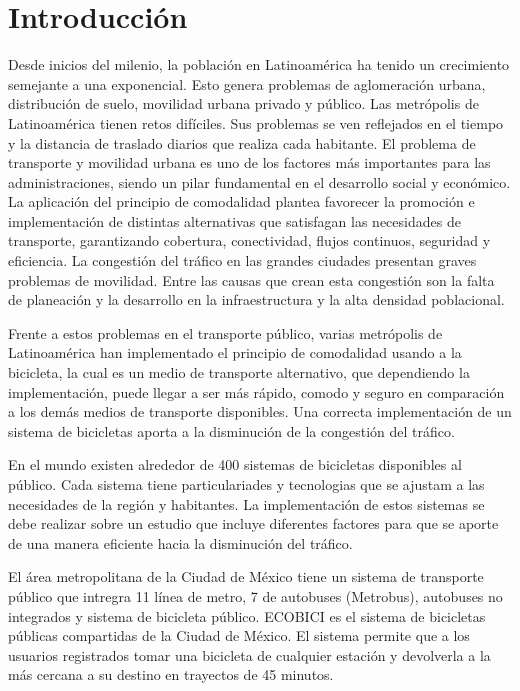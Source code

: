 \section{Introducción}

Desde inicios del milenio, la población en Latinoamérica ha tenido un crecimiento semejante a una exponencial\cite{CEPAL_2015}. Esto genera problemas de aglomeración urbana, distribución de suelo, movilidad urbana privado y público. Las metrópolis de Latinoamérica tienen retos difíciles. Sus problemas se ven reflejados en el tiempo y la distancia de traslado diarios que realiza cada habitante\cite{hall_1978}. El problema de transporte y movilidad urbana es uno de los factores más importantes para las administraciones, siendo un pilar fundamental en el desarrollo social y económico. La aplicación del principio de comodalidad plantea favorecer la promoción e implementación de distintas alternativas que satisfagan las necesidades de transporte, garantizando cobertura, conectividad, flujos continuos, seguridad y eficiencia\cite{pastori_2018}. La congestión del tráfico en las grandes ciudades presentan graves problemas de movilidad. Entre las causas que crean esta congestión son la falta de planeación y la desarrollo en la infraestructura y la alta densidad poblacional.

Frente a estos problemas en el transporte público, varias metrópolis de Latinoamérica han implementado el principio de comodalidad usando a la bicicleta, la cual es un medio de transporte alternativo, que dependiendo la implementación, puede llegar a ser más rápido, comodo y seguro en comparación a los demás medios de transporte disponibles.
Una correcta implementación de un sistema de bicicletas aporta a la disminución de la congestión del tráfico.

En el mundo existen alrededor de 400 sistemas de bicicletas disponibles al público. Cada sistema tiene particulariades y tecnologias que se ajustam a las necesidades de la región y habitantes. La implementación de estos sistemas se debe realizar sobre un estudio que incluye diferentes factores para que se aporte de una manera eficiente hacia la disminución del tráfico.

El área metropolitana de la Ciudad de México tiene un sistema de transporte público que intregra 11 línea de metro, 7 de autobuses (Metrobus), autobuses no integrados y sistema de bicicleta público. ECOBICI es el sistema de bicicletas públicas compartidas de la Ciudad de México. El sistema permite que a los usuarios registrados tomar una bicicleta de cualquier estación y devolverla a la más cercana a su destino en trayectos de 45 minutos.

